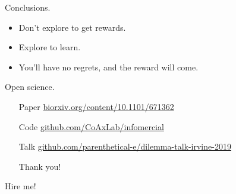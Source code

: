 \documentclass[10pt]{beamer}
\begin{document}
\begin{frame}[fragile]{Conclusions.}
\begin{itemize}
    \item Don't explore to get rewards.
    \item Explore to learn.
    \item You'll have no regrets, and the reward will come.
\end{itemize}
\end{frame}

\begin{frame}[fragile]{Open science.}
\begin{itemize}
\item[Paper] \url{biorxiv.org/content/10.1101/671362}
\item[Code] \url{github.com/CoAxLab/infomercial}
\item[Talk] \url{github.com/parenthetical-e/dilemma-talk-irvine-2019}
\item[] 
\item[] \alert{Thank you!}
\end{itemize}
\end{frame}

\begin{frame}[fragile]{Hire me!}
\end{frame}


%   
%   

\end{document}
